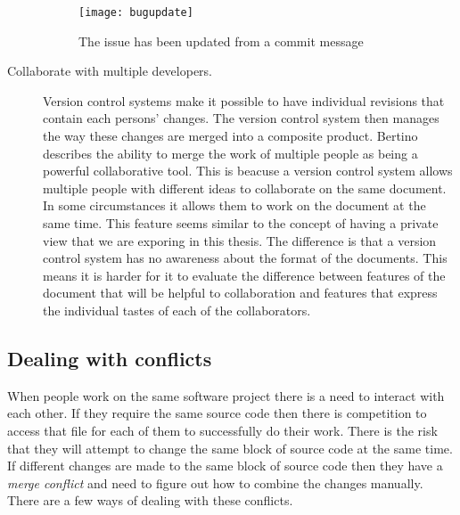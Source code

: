 \begin{description}
  \begin{figure}[!t]
   \begin{center}
    \texttt{[image: bugupdate]}
   \end{center}
   \caption{The issue has been updated from a commit message}
   \label{fig:bgBugUpdate}
  \end{figure}

  \item [Collaborate with multiple developers.]
  Version control systems make it possible to have individual revisions that contain each persons' changes. The version control system then manages the way these changes are merged into a composite product. Bertino \cite{Bertino2012} describes the ability to merge the work of multiple people as being a powerful collaborative tool. This is beacuse a version control system allows multiple people with different ideas to collaborate on the same document. In some circumstances it allows them to work on the document at the same time. This feature seems similar to the concept of having a private view that we are exporing in this thesis. The difference is that a version control system has no awareness about the format of the documents. This means it is harder for it to evaluate the difference between features of the document that will be helpful to collaboration and features that express the individual tastes of each of the collaborators.   

\end{description}



\subsection{Dealing with conflicts}
When people work on the same software project there is a need to interact with each other.
If they require the same source code then there is competition to access that file for each of them to successfully do their work.
There is the risk that they will attempt to change the same block of source code at the same time.
If different changes are made to the same block of source code then they have a \emph{merge conflict} and need to figure out how to combine the changes manually.
There are a few ways of dealing with these conflicts.

